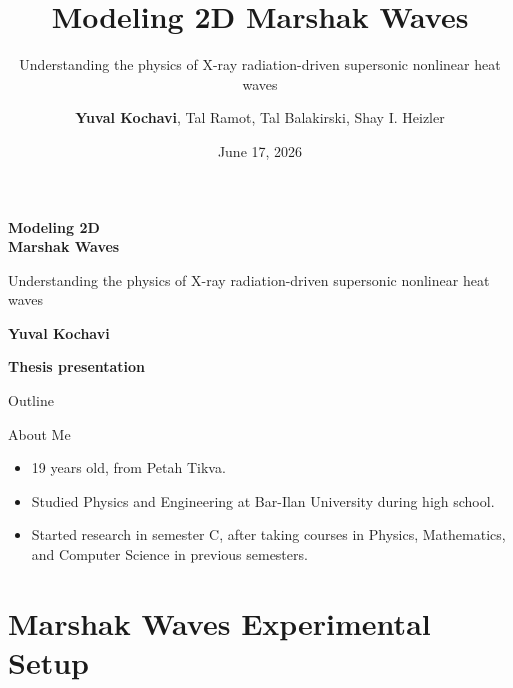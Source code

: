 \documentclass[xcolor=table]{beamer}
\title[Modeling 2D Marshak Waves]{Modeling 2D Marshak Waves}
\subtitle{Understanding the physics of X-ray radiation-driven supersonic nonlinear heat waves}
\author[Kochavi et al.]{\textbf{Yuval Kochavi}, Tal Ramot, Tal Balakirski, Shay I. Heizler}
\date{June 17, 2026}
\begin{document}
{
\begin{frame}[plain]
    \centering
    {\Huge\bfseries\color{white} Modeling 2D \\ Marshak Waves}
    
    \vspace{0.4cm}
    {\small\color{white} Understanding the physics of X-ray radiation-driven supersonic nonlinear heat waves}
    
    \vspace{0.8cm}
    {\large \textbf{\color{white}Yuval Kochavi}}
    
    
    \vspace{1.2cm}
    {\large\textbf{\color{white}Thesis presentation}}
\end{frame}
}

\begin{frame}{Outline}
    \tableofcontents
\end{frame}

\begin{frame}{About Me}
    \begin{itemize}
        \item 19 years old, from Petah Tikva.
        \item Studied Physics and Engineering at Bar-Ilan University during high school.
        \item Started research in semester C, after taking courses in Physics, Mathematics, and Computer Science in previous semesters.
    \end{itemize}
\end{frame}

\section{Marshak Waves Experimental Setup}
\end{document}
